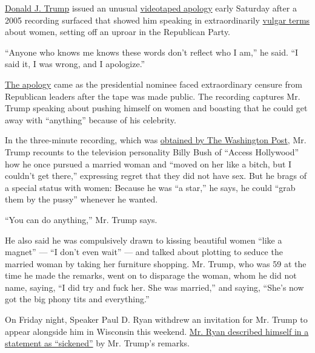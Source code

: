 \href{http://www.nytimes3xbfgragh.onion/2016/10/09/us/politics/donald-trump-campaign.html}{Donald
J. Trump} issued an unusual
\href{http://www.nytimes3xbfgragh.onion/video/us/politics/100000004698416/trump-responds-to-outrage-over-lewd-remarks.html}{videotaped
apology} early Saturday after a 2005 recording surfaced that showed him
speaking in extraordinarily
\href{http://www.nytimes3xbfgragh.onion/2016/10/08/us/donald-trump-tape-transcript.html}{vulgar
terms} about women, setting off an uproar in the Republican Party.

``Anyone who knows me knows these words don't reflect who I am,'' he
said. ``I said it, I was wrong, and I apologize.''

\href{http://www.nytimes3xbfgragh.onion/2016/10/08/us/politics/donald-trump-apology.html}{The
apology} came as the presidential nominee faced extraordinary censure
from Republican leaders after the tape was made public. The recording
captures Mr. Trump speaking about pushing himself on women and boasting
that he could get away with ``anything'' because of his celebrity.

In the three-minute recording, which was
\href{https://www.washingtonpost.com/politics/trump-recorded-having-extremely-lewd-conversation-about-women-in-2005/2016/10/07/3b9ce776-8cb4-11e6-bf8a-3d26847eeed4_story.html}{obtained
by The Washington Post}, Mr. Trump recounts to the television
personality Billy Bush of ``Access Hollywood'' how he once pursued a
married woman and ``moved on her like a bitch, but I couldn't get
there,'' expressing regret that they did not have sex. But he brags of a
special status with women: Because he was ``a star,'' he says, he could
``grab them by the pussy'' whenever he wanted.

``You can do anything,'' Mr. Trump says.

He also said he was compulsively drawn to kissing beautiful women ``like
a magnet'' --- ``I don't even wait'' --- and talked about plotting to
seduce the married woman by taking her furniture shopping. Mr. Trump,
who was 59 at the time he made the remarks, went on to disparage the
woman, whom he did not name, saying, ``I did try and fuck her. She was
married,'' and saying, ``She's now got the big phony tits and
everything.''

On Friday night, Speaker Paul D. Ryan withdrew an invitation for Mr.
Trump to appear alongside him in Wisconsin this weekend.
\href{http://www.nytimes3xbfgragh.onion/interactive/2016/10/08/us/politics/how-paul-ryan-and-mitch-mcconnell-have-disavowed-trumps-words-but-not-their-support.html}{Mr.
Ryan described himself in a statement as ``sickened''} by Mr. Trump's
remarks.

